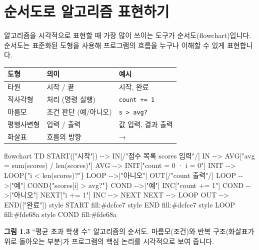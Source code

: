 \documentclass[
  korean,
  11pt,
  a4paper,
  DIV=11,
  numbers=noendperiod]{scrreprt}
\newenvironment{Shaded}{\begin{snugshade}}{\end{snugshade}}
\newcommand{\NormalTok}[1]{\textcolor[rgb]{0.00,0.23,0.31}{#1}}
\newcounter{none} %
\begin{document}
\section{순서도로 알고리즘 표현하기}\label{sec-flowchart}

알고리즘을 시각적으로 표현할 때 가장 많이 쓰이는 도구가
{순서도(flowchart)}입니다. 순서도는 표준화된 도형을 사용해 프로그램의
흐름을 누구나 이해할 수 있게 표현합니다.

{\def\LTcaptype{none} %
\begin{longtable}[]{@{}lll@{}}
\toprule\noalign{}
도형 & 의미 & 예시 \\
\midrule\noalign{}
\endhead
\bottomrule\noalign{}
\endlastfoot
타원 & 시작 / 끝 & 시작, 완료 \\
직사각형 & 처리 (명령 실행) & \texttt{count\ +=\ 1} \\
마름모 & 조건 판단 (예/아니오) & \texttt{s\ \textgreater{}\ avg?} \\
평행사변형 & 입력 / 출력 & 값 입력, 결과 출력 \\
화살표 & 흐름의 방향 & → \\
\end{longtable}
}

\begin{Shaded}
\begin{Highlighting}[]
\NormalTok{flowchart TD}
\NormalTok{    START(["시작"]) {-}{-}\textgreater{} IN[/"점수 목록 scores 입력"/]}
\NormalTok{    IN {-}{-}\textgreater{} AVG["avg = sum(scores) / len(scores)"]}
\NormalTok{    AVG {-}{-}\textgreater{} INIT["count = 0 · i = 0"]}
\NormalTok{    INIT {-}{-}\textgreater{} LOOP\{"i \textless{} len(scores)?"\}}
\NormalTok{    LOOP {-}{-}\textgreater{}|"아니오"| OUT[/"count 출력"/]}
\NormalTok{    LOOP {-}{-}\textgreater{}|"예"| COND\{"scores[i] \textgreater{} avg?"\}}
\NormalTok{    COND {-}{-}\textgreater{}|"예"| INC["count += 1"]}
\NormalTok{    COND {-}{-}\textgreater{}|"아니오"| NEXT["i += 1"]}
\NormalTok{    INC {-}{-}\textgreater{} NEXT}
\NormalTok{    NEXT {-}{-}\textgreater{} LOOP}
\NormalTok{    OUT {-}{-}\textgreater{} END(["완료"])}
\NormalTok{    style START fill:\#dcfce7}
\NormalTok{    style END fill:\#dcfce7}
\NormalTok{    style LOOP fill:\#fde68a}
\NormalTok{    style COND fill:\#fde68a}
\end{Highlighting}
\end{Shaded}

\textbf{그림 1.3} ``평균 초과 학생 수'' 알고리즘의 순서도.
마름모(조건)와 반복 구조(화살표가 위로 돌아오는 부분)가 프로그램의 핵심
논리를 시각적으로 보여 줍니다.
\end{document}

